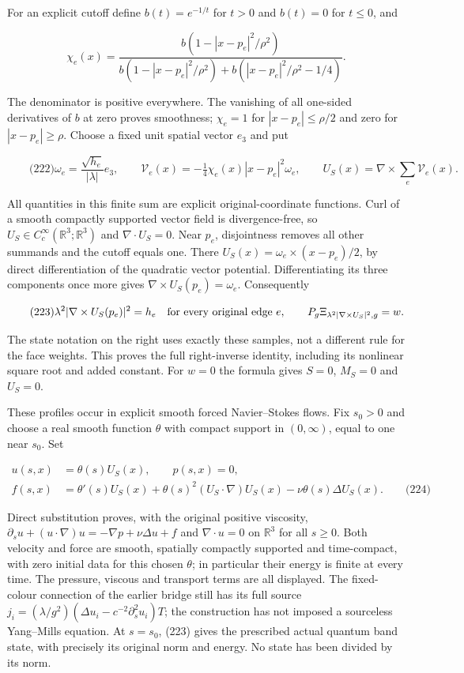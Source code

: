 For an explicit cutoff define \(b(t)=e^{-1/t}\) for \(t>0\) and
\(b(t)=0\) for \(t\le0\), and

\[
\chi_e(x)=\frac{b(1-|x-p_e|^2/\rho^2)}
 {b(1-|x-p_e|^2/\rho^2)+b(|x-p_e|^2/\rho^2-1/4)}.
\]

The denominator is positive everywhere. The vanishing of all one-sided
derivatives of \(b\) at zero proves smoothness; \(\chi_e=1\) for
\(|x-p_e|\le\rho/2\) and zero for \(|x-p_e|\ge\rho\). Choose a fixed
unit spatial vector \(e_3\) and put

\[
\qquad\text{(222)}
 \omega_e=\frac{\sqrt{h_e}}{|\lambda|}e_3,\qquad
 \mathcal V_e(x)=-\tfrac14\chi_e(x)|x-p_e|^2\omega_e,
 \qquad U_S(x)=\nabla\times\sum_e\mathcal V_e(x).
\]

All quantities in this finite sum are explicit original-coordinate
functions. Curl of a smooth compactly supported vector field is
divergence-free, so \(U_S\in C_c^\infty(\mathbb R^3;\mathbb R^3)\) and
\(\nabla\cdot U_S=0\). Near \(p_e\), disjointness removes all other
summands and the cutoff equals one. There
\(U_S(x)=\omega_e\times(x-p_e)/2\), by direct differentiation of the
quadratic vector potential. Differentiating its three components once
more gives \(\nabla\times U_S(p_e)=\omega_e\). Consequently

\[
\qquad\text{(223)}
 \lambda^2|\nabla\times U_S(p_e)|^2=h_e\quad\hbox{for every original edge }e,
 \qquad P_g\Xi_{\lambda^2|\nabla\times U_S|^2,g}=w.
\]

The state notation on the right uses exactly these samples, not a
different rule for the face weights. This proves the full right-inverse
identity, including its nonlinear square root and added constant. For
\(w=0\) the formula gives \(S=0\), \(M_S=0\) and \(U_S=0\).

These profiles occur in explicit smooth forced Navier--Stokes flows. Fix
\(s_0>0\) and choose a real smooth function \(\theta\) with compact
support in \((0,\infty)\), equal to one near \(s_0\). Set

\[
\begin{aligned}
 u(s,x)&=\theta(s)U_S(x),\qquad p(s,x)=0,\\
 f(s,x)&=\theta'(s)U_S(x)
    +\theta(s)^2(U_S\cdot\nabla)U_S(x)-\nu\theta(s)\Delta U_S(x).
 \qquad\text{(224)}
\end{aligned}
\]

Direct substitution proves, with the original positive viscosity,
\(\partial_su+(u\cdot\nabla)u=-\nabla p+\nu\Delta u+f\) and
\(\nabla\cdot u=0\) on \(\mathbb R^3\) for all \(s\ge0\). Both velocity
and force are smooth, spatially compactly supported and time-compact,
with zero initial data for this chosen \(\theta\); in particular their
energy is finite at every time. The pressure, viscous and transport
terms are all displayed. The fixed-colour connection of the earlier
bridge still has its full source
\(j_i=(\lambda/g^2)(\Delta u_i-c^{-2}\partial_s^2u_i)T\); the
construction has not imposed a sourceless Yang--Mills equation. At
\(s=s_0\), (223) gives the prescribed actual quantum band state, with
precisely its original norm and energy. No state has been divided by its
norm.


